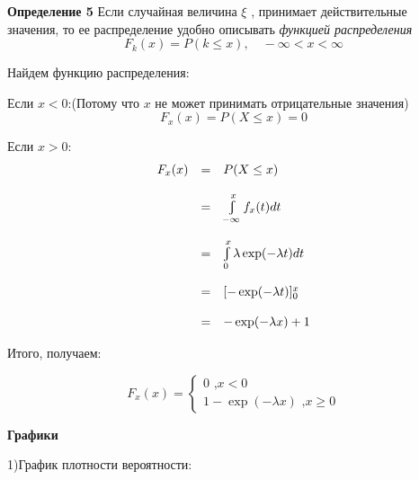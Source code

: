 \documentclass[a4paper,12pt, oneside]{book}
\let\int\varint
\begin{document}
	\normalsize{\textbf{Определение 5} Если случайная  величина $\xi$ , принимает действительные значения, то ее распределение удобно описывать  \textit{ функцией распределения }
	$$
		F_k(x) = P(k \le x), \quad -\infty < x < \infty
	$$
	
	
	\vspace{\baselineskip}
	Найдем функцию распределения:
	
	Если $x < 0$:(Потому что $x$ не может принимать отрицательные значения)
	$$
	F_x(x) = P(X \le x) = 0
	$$
	
	Если $x > 0$:
	$$
	\begin{array}{rcl}
	F_x(x) &=& P(X \le x)\\
	\\
	&=& \int\limits_{-\infty}^{x}f_x(t)dt\\
	\\
	&=& \int\limits_{0}^{x} \lambda\exp(-\lambda t)dt\\
	\\
	&=&[-\exp(-\lambda t)]_0^x\\
	\\
	&=&-\exp(-\lambda x) + 1
	\end{array}	
	$$
	
	Итого, получаем:
	

	\begin{equation*}
	F_x(x) = 
		\begin{cases}
			0 \text{	,$x < 0$}\\
			1 - \exp(-\lambda x) \text{		,$x \ge 0$}
		\end{cases}
	\end{equation*}
	

	\newpage
	\large{\textbf{{Графики}}}
	\vspace{5mm}	
			
	1)График плотности вероятности:

	\begin{minipage}[h]{0.55\linewidth}
	\end{minipage}
	\\
	\vspace{\baselineskip}\\
	
}
\end{document}
